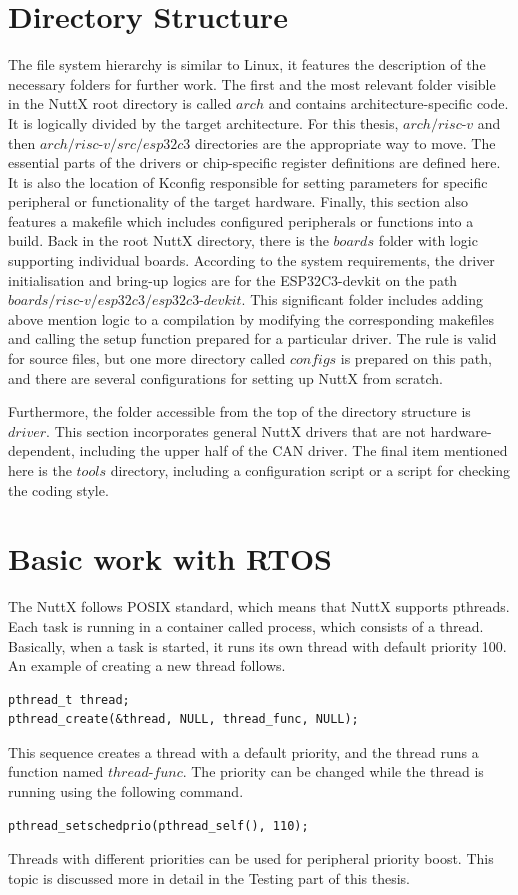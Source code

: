 \documentclass{ctuthesis}
\begin{document}
 \section{Directory Structure}
 The file system hierarchy is similar to Linux,  it features the description of the necessary folders for further work. The first and the most relevant folder visible in the NuttX root directory is called  $arch$ and contains architecture-specific code. It is logically divided by the target architecture. For this thesis, $arch/risc\text{-}v$ and then $arch/risc\text{-}v/src/esp32c3$ directories are the appropriate way to move. The essential parts of the drivers or chip-specific register definitions are defined here. It is also the location of Kconfig responsible for setting parameters for specific peripheral or functionality of the target hardware. Finally, this section also features a makefile which includes configured peripherals or functions into a build. Back in the root NuttX directory, there is the $boards$ folder with logic supporting individual boards. According to the system requirements, the driver initialisation and bring-up logics are for the ESP32C3-devkit on the path $boards/risc\text{-}v/esp32c3/esp32c3\text{-}devkit$. This significant folder includes adding above mention logic to a compilation by modifying the corresponding makefiles and calling the setup function prepared for a particular driver. The rule is valid for source files, but one more directory called $configs$ is prepared on this path, and there are several configurations for setting up NuttX from scratch.  \newline
  
  \quad Furthermore, the folder accessible from the top of the directory structure is $driver$. This section incorporates general NuttX drivers that are not hardware-dependent, including the upper half of the CAN driver. The final item mentioned here is the $tools$ directory, including a configuration script or a script for checking the coding style.

 \section{Basic work with RTOS}
 The NuttX follows POSIX standard, which means that NuttX supports pthreads. Each task is running in a container called process, which consists of a thread. Basically, when a task is started, it runs its own thread with default priority 100. An example of creating a new thread follows.
\begin{verbatim}
pthread_t thread;
pthread_create(&thread, NULL, thread_func, NULL);
\end{verbatim}
 This sequence creates a thread with a default priority, and the thread runs a function named $thread\text{-}func$. The priority can be changed while the thread is running using the following command.
\begin{verbatim}
pthread_setschedprio(pthread_self(), 110);
\end{verbatim}
 Threads with different priorities can be used for peripheral priority boost. This topic is discussed more in detail in the Testing part of this thesis.
 
\end{document}
